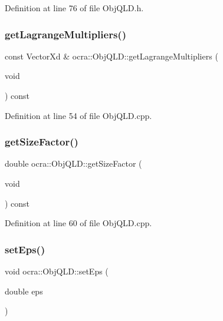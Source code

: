 Definition at line 76 of file Obj\+Q\+L\+D.\+h.

\hypertarget{classocra_1_1ObjQLD_ad462944e0ed165514f301a1b739e3314}{}\label{classocra_1_1ObjQLD_ad462944e0ed165514f301a1b739e3314} 
\subsubsection{\texorpdfstring{get\+Lagrange\+Multipliers()}{getLagrangeMultipliers()}}
{\footnotesize\ttfamily const Vector\+Xd \& ocra\+::\+Obj\+Q\+L\+D\+::get\+Lagrange\+Multipliers (\begin{DoxyParamCaption}\item[{void}]{ }\end{DoxyParamCaption}) const}



Definition at line 54 of file Obj\+Q\+L\+D.\+cpp.

\hypertarget{classocra_1_1ObjQLD_a4ca6b476104cb59e6e533fec778fc437}{}\label{classocra_1_1ObjQLD_a4ca6b476104cb59e6e533fec778fc437} 
\subsubsection{\texorpdfstring{get\+Size\+Factor()}{getSizeFactor()}}
{\footnotesize\ttfamily double ocra\+::\+Obj\+Q\+L\+D\+::get\+Size\+Factor (\begin{DoxyParamCaption}\item[{void}]{ }\end{DoxyParamCaption}) const}



Definition at line 60 of file Obj\+Q\+L\+D.\+cpp.

\hypertarget{classocra_1_1ObjQLD_a6fb05dae8b643ba2dd9e03aac8cde624}{}\label{classocra_1_1ObjQLD_a6fb05dae8b643ba2dd9e03aac8cde624} 
\subsubsection{\texorpdfstring{set\+Eps()}{setEps()}}
{\footnotesize\ttfamily void ocra\+::\+Obj\+Q\+L\+D\+::set\+Eps (\begin{DoxyParamCaption}\item[{double}]{eps }\end{DoxyParamCaption})\hspace{0.3cm}{\ttfamily [inline]}}



